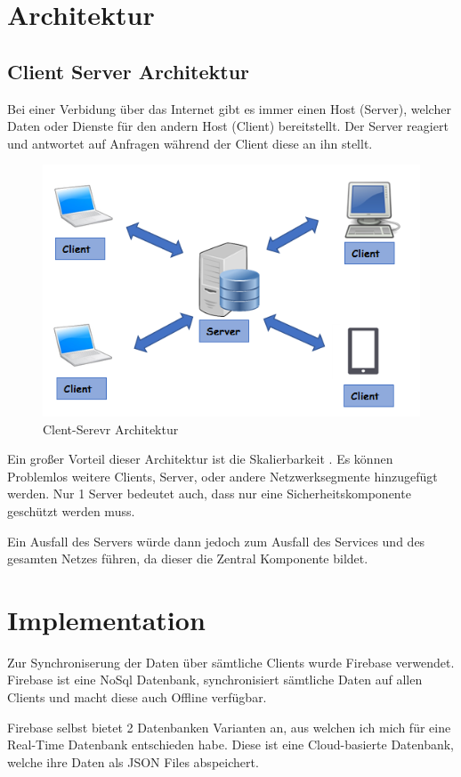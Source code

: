 \section{Architektur}
\subsection{Client Server Architektur}
Bei einer Verbidung über das Internet gibt es immer einen Host (Server), welcher Daten oder Dienste für den andern Host (Client) bereitstellt. Der Server reagiert und antwortet auf Anfragen während der Client diese an ihn stellt.

 \begin{figure}[!h]
 	\centering
 	\includegraphics[width=0.7\linewidth]{images/cs}
 	\caption{Clent-Serevr Architektur}
 	\label{fig:clientserver}
 \end{figure}

Ein großer Vorteil dieser Architektur ist die Skalierbarkeit . Es können Problemlos weitere Clients, Server, oder andere Netzwerksegmente hinzugefügt werden. 
Nur 1 Server bedeutet auch, dass nur eine Sicherheitskomponente geschützt werden muss.

Ein Ausfall des Servers würde dann jedoch zum Ausfall des Services und des gesamten Netzes führen, da dieser die Zentral Komponente bildet.
\clearpage
\section{Implementation}
\label{sec:Ergebnisse}
Zur Synchroniserung der Daten über sämtliche Clients wurde Firebase verwendet. Firebase ist eine NoSql Datenbank, synchronisiert sämtliche Daten auf allen Clients und macht diese auch Offline verfügbar. 

Firebase selbst bietet 2 Datenbanken Varianten an, aus welchen ich mich für eine Real-Time Datenbank entschieden habe. Diese ist eine Cloud-basierte Datenbank, welche ihre Daten als JSON Files abspeichert.

